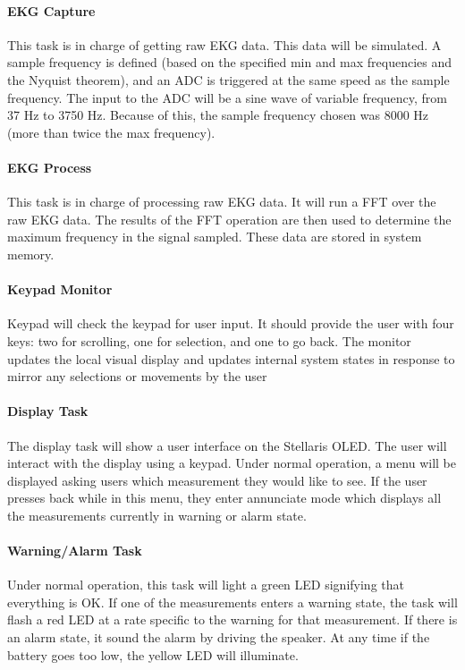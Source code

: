 \documentclass[12pt]{article} %
\begin{document}
    \paragraph{EKG Capture} This task is in charge of getting raw EKG data.  This data
    will be simulated.  A sample frequency is defined (based on the specified min and max
    frequencies and the Nyquist theorem), and an ADC is triggered at the same speed as
    the sample frequency.  The input to the ADC will be a sine wave of variable
    frequency, from 37 Hz to 3750 Hz.  Because of this, the sample frequency
    chosen was 8000 Hz (more than twice the max frequency).

    \paragraph{EKG Process} This task is in charge of processing raw EKG data.
		It will run a FFT over the raw EKG data. The results of the FFT operation
		are then used to determine the maximum frequency in the signal sampled.
		These data are stored in system memory.

    \paragraph{Keypad Monitor} Keypad will check the keypad for user input. It
    should provide the user with four keys: two for scrolling, one for selection,
		and one to go back. The monitor updates the local visual display  and
		updates internal system states in response to mirror any selections or
		movements by the user

    \paragraph{Display Task} The display task will show a user interface on the
    Stellaris OLED. The user will interact with the display using a keypad. Under
    normal operation, a menu will be displayed asking users which measurement they
    would like to see. If the user presses back while in this menu, they enter
    annunciate mode which displays all the measurements currently in warning or
    alarm state.

    \paragraph{Warning/Alarm Task} Under normal operation, this task will light a
    green LED signifying that everything is OK. If one of the measurements enters
    a warning state, the task will flash a red LED at a rate specific to the
    warning for that measurement. If there is an alarm state, it sound the alarm
    by driving the speaker. At any time if the battery goes too low, the yellow
    LED will illuminate.
\end{document}
